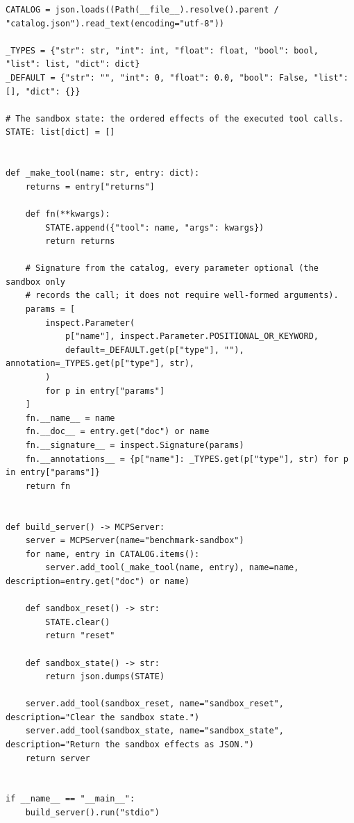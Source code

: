 \documentclass[11pt,a4paper]{article}
\begin{document}
\begin{lstlisting}[firstnumber=21,style=py,caption={Sandbox MCP server (\texttt{benchmark/sandbox\_server.py}, lines 21--71)},label={lst:sandboxserver}]
CATALOG = json.loads((Path(__file__).resolve().parent / "catalog.json").read_text(encoding="utf-8"))

_TYPES = {"str": str, "int": int, "float": float, "bool": bool, "list": list, "dict": dict}
_DEFAULT = {"str": "", "int": 0, "float": 0.0, "bool": False, "list": [], "dict": {}}

# The sandbox state: the ordered effects of the executed tool calls.
STATE: list[dict] = []


def _make_tool(name: str, entry: dict):
    returns = entry["returns"]

    def fn(**kwargs):
        STATE.append({"tool": name, "args": kwargs})
        return returns

    # Signature from the catalog, every parameter optional (the sandbox only
    # records the call; it does not require well-formed arguments).
    params = [
        inspect.Parameter(
            p["name"], inspect.Parameter.POSITIONAL_OR_KEYWORD,
            default=_DEFAULT.get(p["type"], ""), annotation=_TYPES.get(p["type"], str),
        )
        for p in entry["params"]
    ]
    fn.__name__ = name
    fn.__doc__ = entry.get("doc") or name
    fn.__signature__ = inspect.Signature(params)
    fn.__annotations__ = {p["name"]: _TYPES.get(p["type"], str) for p in entry["params"]}
    return fn


def build_server() -> MCPServer:
    server = MCPServer(name="benchmark-sandbox")
    for name, entry in CATALOG.items():
        server.add_tool(_make_tool(name, entry), name=name, description=entry.get("doc") or name)

    def sandbox_reset() -> str:
        STATE.clear()
        return "reset"

    def sandbox_state() -> str:
        return json.dumps(STATE)

    server.add_tool(sandbox_reset, name="sandbox_reset", description="Clear the sandbox state.")
    server.add_tool(sandbox_state, name="sandbox_state", description="Return the sandbox effects as JSON.")
    return server


if __name__ == "__main__":
    build_server().run("stdio")
\end{lstlisting}
\end{document}
